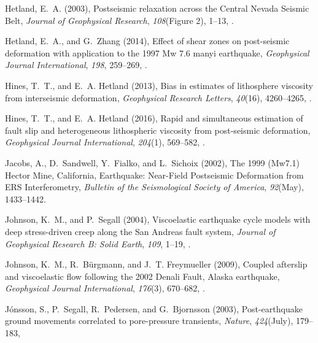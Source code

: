 \documentclass[draft,linenumbers]{AGUJournal}
\begin{document}
\begin{thebibliography}{52}
Hetland, E.~A. (2003), {Postseismic relaxation across the Central Nevada
  Seismic Belt}, \textit{Journal of Geophysical Research}, \textit{108}(Figure
  2), 1--13, .

Hetland, E.~A., and G.~Zhang (2014), {Effect of shear zones on post-seismic
  deformation with application to the 1997 Mw 7.6 manyi earthquake},
  \textit{Geophysical Journal International}, \textit{198}, 259--269,
  .

Hines, T.~T., and E.~A. Hetland (2013), {Bias in estimates of lithosphere
  viscosity from interseismic deformation}, \textit{Geophysical Research
  Letters}, \textit{40}(16), 4260--4265, .

Hines, T.~T., and E.~A. Hetland (2016), {Rapid and simultaneous estimation of
  fault slip and heterogeneous lithospheric viscosity from post-seismic
  deformation}, \textit{Geophysical Journal International}, \textit{204}(1),
  569--582, .

Jacobs, A., D.~Sandwell, Y.~Fialko, and L.~Sichoix (2002), {The 1999 (Mw7.1)
  Hector Mine, California, Earthquake: Near-Field Postseismic Deformation from
  ERS Interferometry}, \textit{Bulletin of the Seismological Society of
  America}, \textit{92}(May), 1433--1442.

Johnson, K.~M., and P.~Segall (2004), {Viscoelastic earthquake cycle models
  with deep stress-driven creep along the San Andreas fault system},
  \textit{Journal of Geophysical Research B: Solid Earth}, \textit{109}, 1--19,
  .

Johnson, K.~M., R.~B{\"{u}}rgmann, and J.~T. Freymueller (2009), {Coupled
  afterslip and viscoelastic flow following the 2002 Denali Fault, Alaska
  earthquake}, \textit{Geophysical Journal International}, \textit{176}(3),
  670--682, .

J{\'{o}}nsson, S., P.~Segall, R.~Pedersen, and G.~Bjornsson (2003),
  {Post-earthquake ground movements correlated to pore-pressure transients},
  \textit{Nature}, \textit{424}(July), 179--183, 


\end{thebibliography}
\end{document}
